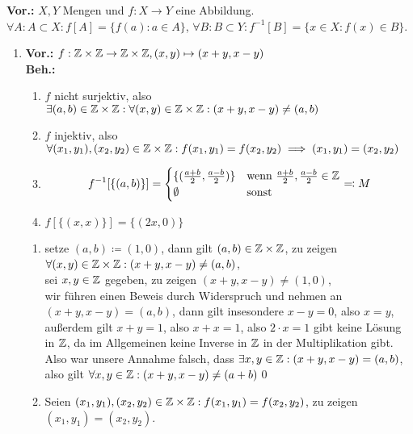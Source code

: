 \documentclass{gadsescript}
\begin{document}
\maketitle
\textbf{Vor.:} $ X, Y $ Mengen und $ f : X \to Y $ eine Abbildung. $ \forall A: A \subset X : f[A] = \{ f(a) : a \in A \} $, $ \forall B: B \subset Y : f^{-1}[B] = \{ x \in X : f(x) \in B \} $.
\begin{enumerate}[label=(\alph*)]
	\item \textbf{Vor.:} $ f : \mathbb{Z} \times \mathbb{Z} \to \mathbb{Z} \times \mathbb{Z}, (x, y) \mapsto ( x + y, x - y) $\\
		\textbf{Beh.:}
		\begin{enumerate}[label=(\roman*)]
			\item $ f $ nicht surjektiv, also $ \exists (a, b) \in \mathbb{Z} \times \mathbb{Z} : \forall (x, y) \in \mathbb{Z} \times \mathbb{Z} : (x + y, x - y) \neq (a, b) $
			\item $ f $ injektiv, also $ \forall (x_1, y_1), (x_2, y_2) \in \mathbb{Z} \times \mathbb{Z} : f(x_1, y_1) = f(x_2, y_2) \implies (x_1, y_1) = (x_2, y_2)$
			\item \[ f^{-1} [\{(a, b)\}] =
				\begin{cases}
					\{ (\frac{a+b}{2}, \frac{a-b}{2}) \} & \text{wenn } \frac{a + b}{2}, \frac{a - b}{2} \in \mathbb{Z}\\
					\emptyset & \text{sonst}
				\end{cases} \eqqcolon M
				\]
			\item $ f[\{(x,x)\}] = \{(2x, 0)\} $
		\end{enumerate}
		\begin{proof*}[(i) - (iv)]
			\begin{enumerate}[label=(\roman*)]
				\item setze $ (a, b) \coloneqq (1, 0) $, dann gilt $ (a, b) \in \mathbb{Z} \times \mathbb{Z} $, zu zeigen $ \forall (x, y) \in \mathbb{Z} \times \mathbb{Z} : (x + y, x - y) \neq (a, b) $,\\
					sei $ x, y \in \mathbb{Z} $ gegeben, zu zeigen $ (x + y, x - y) \neq (1, 0) $,\\
					wir führen einen Beweis durch Widerspruch und nehmen an $ ( x + y, x - y ) = ( a, b ) $, dann gilt insesondere $ x - y = 0 $, also $ x = y $,
					außerdem gilt $ x + y = 1 $, also $ x + x = 1 $, also $ 2 \cdot x = 1 $ \Lightning gibt keine Lösung in $ \mathbb{Z} $, da im Allgemeinen keine Inverse in $\mathbb{Z}$ in der Multiplikation gibt. Also war unsere Annahme falsch, dass $ \exists x, y \in \mathbb{Z} : ( x + y, x - y ) = ( a , b ) $, also gilt $ \forall x, y \in \mathbb{Z} : ( x + y, x - y) \neq ( a + b) $\qed
				\item Seien $(x_1, y_1), (x_2, y_2) \in \mathbb{Z} \times \mathbb{Z} : f(x_1, y_1) = f(x_2, y_2) $, zu zeigen $ (x_1, y_1) = (x_2, y_2) $.\\

\end{enumerate}
\end{proof*}
\end{enumerate}
\end{document}
